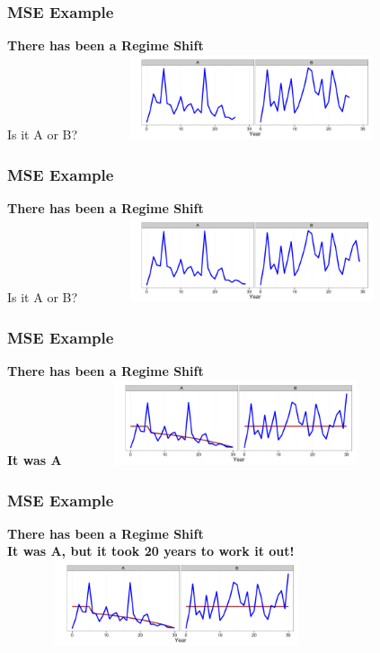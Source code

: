 \begin{frame}\frametitle{MSE Example} \smallskip\textbf{There has been a {\color{blue} Regime Shift}}\smallskip\\ Is it A or B? \includegraphics[height=25mm,width=100mm]{doug22.png}\end{frame}
\begin{frame}\frametitle{MSE Example} \smallskip\textbf{There has been a {\color{blue} Regime Shift}}\smallskip\\ Is it A or B? \includegraphics[height=25mm,width=100mm]{doug25.png}\end{frame}
\begin{frame}\frametitle{MSE Example} \smallskip\textbf{There has been a {\color{blue} Regime Shift}}\smallskip\\ \textbf{It was A} \includegraphics[height=25mm,width=100mm]{doug27.png}\end{frame}
\begin{frame}\frametitle{MSE Example} \smallskip\textbf{There has been a {\color{blue} Regime Shift}}\smallskip\\ \textbf{It was A, {\color{red} but it took 20 years to work it out!}} \includegraphics[height=25mm,width=100mm]{doug27.png}\end{frame}

